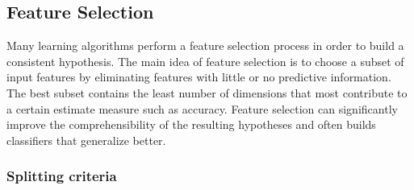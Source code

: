 \newpage
\subsection{Feature Selection}
Many learning algorithms perform a feature selection process in order to build a consistent hypothesis. The main idea of feature selection is to choose a subset of input features by eliminating features with little or no predictive information. The best subset contains the least number of dimensions that most contribute to a certain estimate measure such as accuracy. Feature selection can significantly improve the comprehensibility of the resulting hypotheses and often builds classifiers that generalize better.   

\subsubsection{Splitting criteria} 

